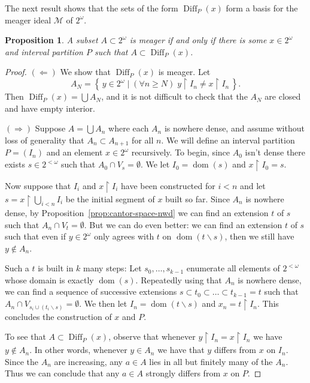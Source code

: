 \documentclass[11pt,oneside,a4paper]{amsbook}
\newcommand{\set}[1]{\left\{\,#1\,\right\}}
\DeclareMathOperator{\dom}{dom}
\DeclareMathOperator{\Diff}{Diff}
\theoremstyle{definition}
\theoremstyle{plain}
\newtheorem{proposition}[theorem]{Proposition}
\theoremstyle{definition}
\theoremstyle{remark}
\numberwithin{equation}{section}
\numberwithin{figure}{section}
\begin{document}
The next result shows that the sets of the form $\Diff_P(x)$ form a basis for the meager ideal $\mathcal M$ of $2^\omega$.

\begin{proposition}
  \label{prop:meager-diff}
  A subset $A\subset2^\omega$ is meager if and only if there is some $x\in2^\omega$ and interval partition $P$ such that $A\subset\Diff_P(x)$.
\end{proposition}

\begin{proof}
  $(\Leftarrow)$ We show that $\Diff_P(x)$ is meager. Let
  \[A_N=\set{y\in2^\omega\mid(\forall n\geq N)\;y\restriction I_n\neq x\restriction I_n}\text{.}
  \]
  Then $\Diff_P(x)=\bigcup A_N$, and it is not difficult to check that the $A_N$ are closed and have empty interior.

  $(\Rightarrow)$ Suppose $A=\bigcup A_n$ where each $A_n$ is nowhere dense, and assume without loss of generality that $A_n\subset A_{n+1}$ for all $n$. We will define an interval partition $P=(I_n)$ and an element $x\in2^\omega$ recursively. To begin, since $A_0$ isn't dense there exists $s\in2^{<\omega}$ such that $A_0\cap V_s=\emptyset$. We let $I_0=\dom(s)$ and $x\restriction I_0=s$.

  Now suppose that $I_i$ and $x\restriction I_i$ have been constructed for $i<n$ and let $s=x\restriction\bigcup_{i<n}I_i$ be the initial segment of $x$ built so far. Since $A_n$ is nowhere dense, by Proposition~\ref{prop:cantor-space-nwd} we can find an extension $t$ of $s$ such that $A_n\cap V_t=\emptyset$. But we can do even better: we can find an extension $t$ of $s$ such that even if $y\in2^\omega$ only agrees with $t$ on $\dom(t\smallsetminus s)$, then we still have $y\notin A_n$.

  Such a $t$ is built in $k$ many steps: Let $s_0,\ldots,s_{k-1}$ enumerate all elements of $2^{<\omega}$ whose domain is exactly $\dom(s)$. Repeatedly using that $A_n$ is nowhere dense, we can find a sequence of successive extensions $s\subset t_0\subset\ldots\subset t_{k-1}=t$ such that $A_n\cap V_{s_i\cup(t_i\smallsetminus s)}=\emptyset$. We then let $I_n=\dom(t\smallsetminus s)$ and $x_n=t\restriction I_n$. This concludes the construction of $x$ and $P$.

  To see that $A\subset\Diff_P(x)$, observe that whenever $y\restriction I_n=x\restriction I_n$ we have $y\notin A_n$. In other words, whenever $y\in A_n$ we have that $y$ differs from $x$ on $I_n$. Since the $A_n$ are increasing, any $a\in A$ lies in all but finitely many of the $A_n$. Thus we can conclude that any $a\in A$ strongly differs from $x$ on $P$.
\end{proof}
\end{document}

